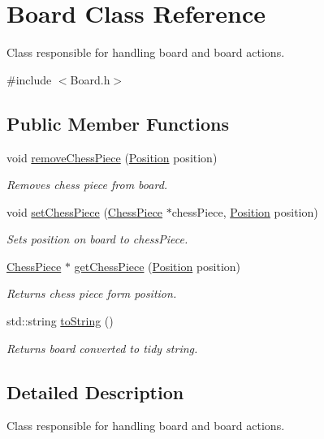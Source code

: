 \hypertarget{classBoard}{}\section{Board Class Reference}
\label{classBoard}


Class responsible for handling board and board actions.  




{\ttfamily \#include $<$Board.\+h$>$}

\subsection*{Public Member Functions}
\begin{DoxyCompactItemize}
\item 
void \hyperlink{classBoard_a10531cbaada84808632ae9933c9f1306}{remove\+Chess\+Piece} (\hyperlink{classPosition}{Position} position)
\begin{DoxyCompactList}\small\item\em Removes chess piece from board. \end{DoxyCompactList}\item 
void \hyperlink{classBoard_aafb3a9f7f623360f66532e2f5fea0c2f}{set\+Chess\+Piece} (\hyperlink{classChessPiece}{Chess\+Piece} $\ast$chess\+Piece, \hyperlink{classPosition}{Position} position)
\begin{DoxyCompactList}\small\item\em Sets position on board to chess\+Piece. \end{DoxyCompactList}\item 
\hyperlink{classChessPiece}{Chess\+Piece} $\ast$ \hyperlink{classBoard_aa9344089fc229e9dcc23e58405af14d9}{get\+Chess\+Piece} (\hyperlink{classPosition}{Position} position)
\begin{DoxyCompactList}\small\item\em Returns chess piece form position. \end{DoxyCompactList}\item 
std\+::string \hyperlink{classBoard_a2cf2b2f6adc453bc3b086c9f10c77e11}{to\+String} ()
\begin{DoxyCompactList}\small\item\em Returns board converted to tidy string. \end{DoxyCompactList}\end{DoxyCompactItemize}


\subsection{Detailed Description}
Class responsible for handling board and board actions. 

